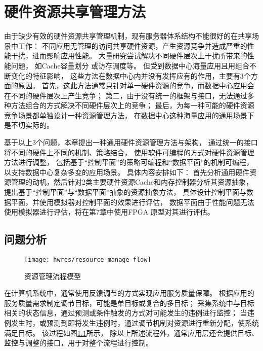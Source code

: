 

\chapter{硬件资源共享管理方法}
\label{chap:hwresman}

由于缺少有效的硬件资源共享管理机制，现有服务器体系结构不能很好的在共享场景中工作：
不同应用无管理的访问共享硬件资源，产生资源竞争并造成严重的性能干扰，进而影响应用性能。
大量研究尝试解决不同硬件层次上干扰所带来的性能问题，
如Cache容量划分\cite{kasture_ubik:_2014, sanchez_vantage:_2011, sanchez_zcache:_2010, qureshi_utility-based_2006}
或访存调度\cite{muralidhara_reducing_2011}等。
但受到数据中心海量应用\cite{Reiss_googletrace_2012}且用组合不断变化的特征影响，
这些方法在数据中心内并没有发挥应有的作用，主要有3个方面的原因。
首先，这此方法通常只针对单一硬件资源的竞争，而数据中心应用会在不同的硬件层次上产生竞争；
第二，由于没有统一的框架与接口，无法通过多种方法组合的方式解决不同硬件层次上的竞争；
最后，为每一种可能的硬件资源竞争场景都单独设计一种资源管理方法，
在数据中心这种海量应用的通用场景下是不切实际的。

基于以上3个问题，本章提出一种通用硬件资源管理方法与架构，
通过统一的接口将不同的硬件上不同的机制、策略结合，
使用软件可编程的方式对硬件资源管理方法进行调整，
包括基于``控制平面''的策略可编程和``数据平面''的机制可编程，
以支持数据中心复杂多变的应用场景。
具体内容安排如下：
首先分析通用硬件资源管理的动机，然后针对2类主要硬件资源Cache和内存控制器分析其资源抽象，
提出基于``控制平面''与``数据平面''抽象的资源抽象方法，
具体设计控制平面与数据平面，并使用模拟器对控制平面的效果进行评估，
数据平面由于性能问题无法使用模拟器进行评估，将在第7章中使用FPGA 原型对其进行评估。


\section{问题分析}

\begin{figure}[tb]
  \centering
  \texttt{[image: hwres/resource-manage-flow]}
  \caption{资源管理流程模型}
  \label{fig:resource-manage-flow}
\end{figure}

在计算机系统中，通常使用反馈调节的方式实现应用服务质量保障。
根据应用的服务质量需求制定调节目标，可能是单目标或复合的多目标；
采集系统中与目标相关的状态信息，通过预测或条件触发的方式对可能发生的违例进行监控；
当违例发生时，或预测到即将发生违例时，通过调节机制对资源进行重新分配，使系统满足目标。
该过程如图\ref{fig:resource-manage-flow}所示，
除以上所述流程外，通常应用层还会提供目标、监控与调整的接口，用于对整个流程进行控制。

